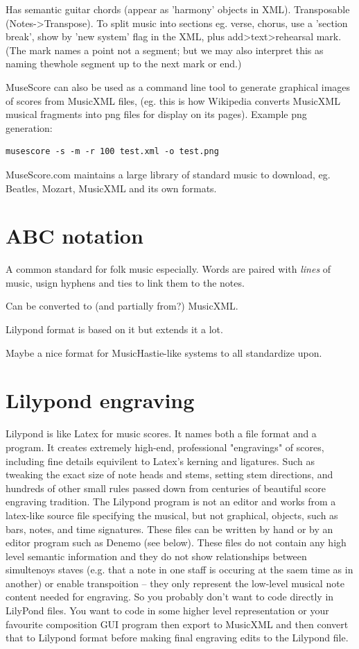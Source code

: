 \documentclass[oneside,english]{scrbook}
\begin{document}
Has semantic guitar chords (appear as 'harmony' objects in XML). Transposable (Notes->Transpose). To split music into sections eg. verse, chorus, use a 'section break', show by 'new system' flag in the XML, plus add>text>rehearsal mark. (The mark names a point not a segment; but we may also interpret this as naming thewhole segment up to the next mark or end.)


MuseScore can also be used as a command line tool to generate graphical images of scores from MusicXML files, (eg. this is how Wikipedia converts MusicXML musical fragments into png files for display on its pages). Example png generation:

\begin{verbatim}
musescore -s -m -r 100 test.xml -o test.png
\end{verbatim}

MuseScore.com maintains a large library of standard music to download, eg. Beatles, Mozart, MusicXML and its own formats.

\section{ABC notation}

A common standard for folk music especially.   Words are paired with {\em lines} of music, usign hyphens and ties to link them to the notes.

Can be converted to (and partially from?) MusicXML.

Lilypond format is based on it but extends it a lot.

Maybe a nice format for MusicHastie-like systems to all standardize upon.


\section{Lilypond engraving}

Lilypond is like Latex for music scores.  It names both a file format and a program.  It creates extremely high-end, professional "engravings" of scores, including fine details equivilent to Latex's kerning and ligatures. Such as tweaking the exact size of note heads and stems, setting stem directions, and hundreds of other small rules passed down from centuries of beautiful score engraving tradition.   The Lilypond program is not an editor and works from a latex-like source file specifying the musical, but not graphical, objects, such as bars, notes, and time signatures. These files can be written by hand or by an editor program such as Denemo (see below). These files do not contain any high level semantic information and they do not show relationships between simultenoys staves (e.g. that a note in one staff is occuring at the saem time as in another) or enable transpoition -- they only represent the low-level musical note content needed for engraving. So you probably don't want to code directly in LilyPond files. You want to code in some higher level representation or your favourite composition GUI program then export to MusicXML and then convert that to Lilypond format before making final engraving edits to the Lilypond file.  
\end{document}
